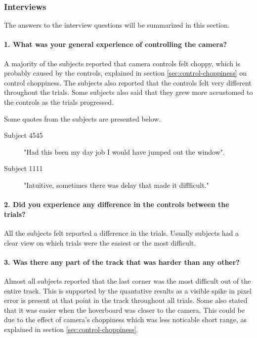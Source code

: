 \documentclass[nofilelist]{cslthse-msc}
\begin{document}
\subsubsection{Interviews}
The answers to the interview questions will be summarized in this section.

\titleformat{\paragraph}[hang]{\normalfont\small\bfseries}{\theparagraph}{1em}{}

\paragraph{1. What was your general experience of controlling the camera?}
A majority of the subjects reported that camera controls felt choppy, which is probably caused by the controls, explained in section \ref{sec:control-choppiness} on control choppiness. The subjects also reported that the controls felt very different throughout the trials. Some subjects also said that they grew more accustomed to the controls as the trials progressed.

Some quotes from the subjects are presented below.
\begin{description}
   \item[Subject 4545] "Had this been my day job I would have jumped out the window". 
   \item[Subject 1111] "Intuitive, sometimes there was delay that made it diffficult."
\end{description}

\paragraph{2. Did you experience any difference in the controls between the trials?}
All the subjects felt reported a difference in the trials. Usually subjects had a clear view on which trials were the easiest or the most difficult.

\paragraph{3. Was there any part of the track that was harder than any other?}
Almost all subjects reported that the last corner was the most difficult out of the entire track. This is supported by the quantative results as a visible spike in pixel error is present at that point in the track throughout all trials.
Some also stated that it was easier when the hoverboard was closer to the camera. This could be due to the effect of camera's choppiness which was less noticable short range, as explained in section \ref{sec:control-choppiness}.
\end{document}
